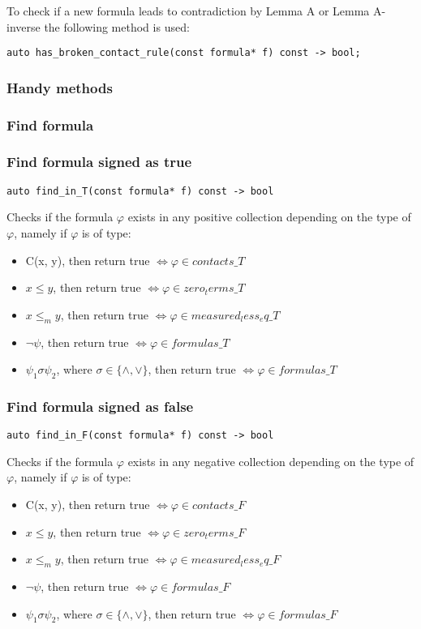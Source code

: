 \documentclass{article}
\begin{document}
				To check if a new formula leads to contradiction by Lemma A or Lemma A-inverse the following method is used:
				\begin{lstlisting}
auto has_broken_contact_rule(const formula* f) const -> bool;
				\end{lstlisting}

			\subsubsection{Handy methods}
			\subsubsection*{Find formula}
			\subsubsection*{Find formula signed as true}
				\begin{lstlisting}
auto find_in_T(const formula* f) const -> bool
				\end{lstlisting}
				Checks if the formula $\varphi$ exists in any positive collection depending on the type of $\varphi$, namely
				if $\varphi$ is of type:
				\begin{itemize}
					\item C(x, y), then return true $\iff \varphi \in contacts\_T$
					\item $x \le y$, then return true $\iff \varphi \in zero_terms\_T$
					\item $x \le_m y$, then return true $\iff \varphi \in measured_less_eq\_T$
					\item $\neg \psi$, then return true $\iff \varphi \in formulas\_T$
					\item $\psi_1 \sigma \psi_2$, where $\sigma \in \{\wedge, \vee\}$, then return true $\iff \varphi \in formulas\_T$
				\end{itemize}
			\subsubsection*{Find formula signed as false}
				\begin{lstlisting}
auto find_in_F(const formula* f) const -> bool
				\end{lstlisting}
				Checks if the formula $\varphi$ exists in any negative collection depending on the type of $\varphi$, namely
				if $\varphi$ is of type:
				\begin{itemize}
					\item C(x, y), then return true $\iff \varphi \in contacts\_F$
					\item $x \le y$, then return true $\iff \varphi \in zero_terms\_F$
					\item $x \le_m y$, then return true $\iff \varphi \in measured_less_eq\_F$
					\item $\neg \psi$, then return true $\iff \varphi \in formulas\_F$
					\item $\psi_1 \sigma \psi_2$, where $\sigma \in \{\wedge, \vee\}$, then return true $\iff \varphi \in formulas\_F$
				\end{itemize}
\end{document}
